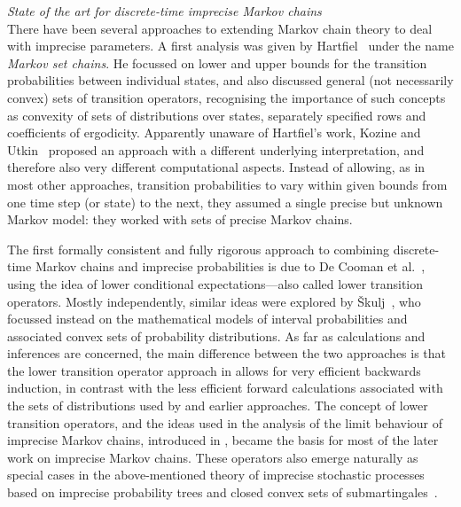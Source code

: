 \documentclass[11pt,dvipsnames,usenames,a4paper]{article}
\begin{document}
\emph{State of the art for discrete-time imprecise Markov chains}\\[5pt]
There have been several approaches to extending Markov chain theory to deal with imprecise parameters. 
A first analysis was given by Hartfiel~\cite{hartfiel1998} under the name \emph{Markov set chains}.
He focussed on lower and upper bounds for the transition probabilities between individual states, and also discussed general (not necessarily convex) sets of transition operators, recognising the importance of such concepts as convexity of sets of distributions over states, separately specified rows and coefficients of ergodicity. 
Apparently unaware of Hartfiel's work, Kozine and Utkin~\cite{utkin:02} proposed an approach with a different underlying interpretation, and therefore also very different computational aspects. 
Instead of allowing, as in most other approaches, transition probabilities to vary within given bounds from one time step (or state) to the next, they assumed a single precise but unknown Markov model: they worked with sets of precise Markov chains. 

The first formally consistent and fully rigorous approach to combining discrete-time Markov chains and imprecise probabilities is due to De Cooman et al.~\cite{cooman2008}, using the idea of lower conditional expectations---also called lower transition operators. 
Mostly independently, similar ideas were explored by Škulj~\cite{skulj:09}, who focussed instead on the mathematical models of interval probabilities and associated convex sets of probability distributions. 
As far as calculations and inferences are concerned, the main difference between the two approaches is that the lower transition operator approach in \cite{cooman2008} allows for very efficient backwards induction, in contrast with the less efficient forward calculations associated with the sets of distributions used by \cite{skulj:09} and earlier approaches. 
The concept of lower transition operators, and the ideas used in the analysis of the limit behaviour of imprecise Markov chains, introduced in \cite{cooman2008}, became the basis for most of the later work on imprecise Markov chains. 
These operators also emerge naturally as special cases in the above-mentioned theory of imprecise stochastic processes based on imprecise probability trees and closed convex sets of submartingales~\cite{cooman2015:markovergodic}.
\end{document}
